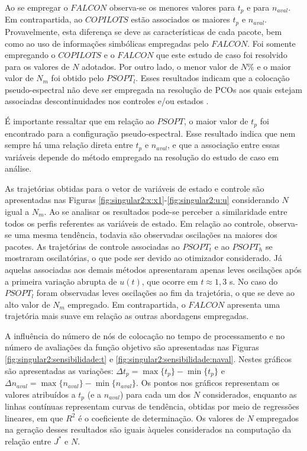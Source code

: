 Ao se empregar o $ FALCON $ observa-se os menores valores para $ t_p $ e para $ n_{aval} $. Em contrapartida, ao $ COPILOTS $ estão associados os maiores $ t_p $ e $ n_{aval} $. Provavelmente, esta diferença se deve as características de cada pacote, bem como ao uso de informações simbólicas empregadas pelo $ FALCON $. Foi somente empregando o $ COPILOTS $ e o $ FALCON $ que este estudo de caso foi resolvido para os valores de $N$ adotados. Por outro lado, o menor valor de $ N\% $ e o maior valor de $ N_m $ foi obtido pelo $ PSOPT_l $. Esses resultados indicam que a colocação pseudo-espectral não deve ser empregada na resolução de PCOs aos quais estejam associadas descontinuidades nos controles e/ou estados \cite{becerra_tutorial_2010}. 

É importante ressaltar que em relação ao $ PSOPT $, o maior valor de $ t_p $ foi encontrado para a configuração pseudo-espectral. Esse resultado indica que nem sempre há uma relação direta entre $ t_p $ e $ n_{aval} $, e que a associação entre essas variáveis depende do método empregado na resolução do estudo de caso em análise. 


As trajetórias obtidas para o vetor de variáveis de estado e controle são apresentadas nas Figuras \ref{fig:singular2:x:x1}-\ref{fig:singular2:u:u} considerando $N$ igual a $N_m$. Ao se analisar os resultados pode-se perceber a similaridade entre todos os perfis referentes as variáveis de estado. Em relação ao controle, observa-se uma mesma tendência, todavia são observadas oscilações na maiores dos pacotes. As trajetórias de controle associadas ao $ PSOPT_t $ e ao $ PSOPT_h $ se mostraram oscilatórias, o que pode ser devido ao otimizador considerado. Já aquelas associadas aos demais métodos apresentaram apenas leves oscilações após a primeira variação abrupta de $ u(t) $, que ocorre em $ t \approx 1,3 $ s. No caso do $ PSOPT_l $ foram observadas leves oscilações ao fim da trajetória, o que se deve ao alto valor de $ N_m $ empregado. Em contrapartida, o $ FALCON $ apresenta uma trajetória mais suave em relação as outras abordagens empregadas. 

A influência do número de nós de colocação no tempo de processamento e no número de avaliações da função objetivo são apresentadas nas Figuras \ref{fig:singular2:sensibilidade:t} e \ref{fig:singular2:sensibilidade:naval}. Nestes gráficos são apresentadas as variações: $ \Delta t_p = \max\{t_p\} - \min\{t_p\} $ e $ \Delta n_{aval} = \max\{n_{aval}\} - \min\{n_{aval}\} $. Os pontos nos gráficos representam os valores atribuídos a $ t_p $ (e a $ n_{aval} $) para cada um dos $ N $ considerados, enquanto as linhas contínuas representam curvas de tendência, obtidas por meio de regressões lineares, em que $R^2$ é o coeficiente de determinação. Os valores de $ N $ empregados na geração desses resultados são iguais àqueles considerados na computação da relação entre $ J^* $ e $ N $. 

